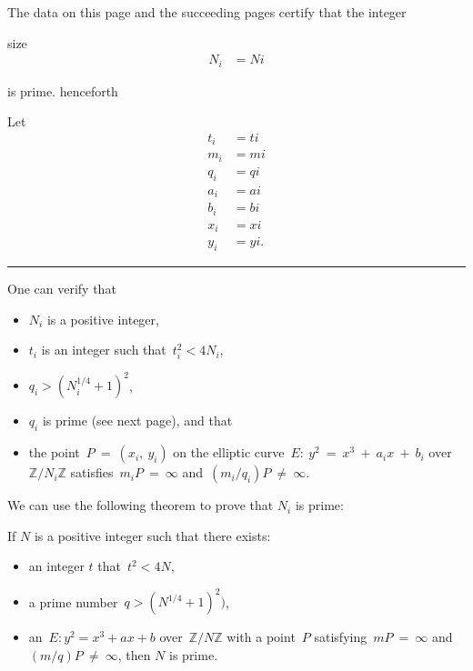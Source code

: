 \pagestyle{empty}
\phantom{a}
\vspace{2em}

\begin{center}
{\Huge {}}
\end{center}
\vspace{2em}

\noindent The data on this page and the succeeding pages certify that the integer

{ {{ size }}%
\begin{align*}
N_{ {{ i }} } &= {{ Ni }}
\end{align*}
}

\noindent is prime. {{ henceforth }}

\vspace{2em}

\noindent Let
{\tiny
\begin{align*}
t_{ {{ i }} } &= {{ ti }} \\
m_{ {{ i }} } &= {{ mi }} \\
q_{ {{ i }} } &= {{ qi }} \\
a_{ {{ i }} } &= {{ ai }} \\
b_{ {{ i }} } &= {{ bi }} \\
x_{ {{ i }} } &= {{ xi }} \\
y_{ {{ i }} } &= {{ yi }}.
\end{align*}
}

\vspace{0.5em}
\hrule
\vspace{0.5em}

\begin{multicols}{2}
\noindent One can verify that
\begin{itemize}
\item $N_{ {{ i }} }$ is a positive integer,
\item $t_{ {{ i }} }$ is an integer such that~$t_{ {{ i }} }^2 < 4N_{ {{ i }} }$,
\item $q_{ {{ i }} } > \left(N_{ {{ i }} }^{1/4} + 1\right)^2$,
\item $q_{ {{ i }} }$ is prime (see next page), and that
\item the point~$P~=~(x_{ {{ i }} },~y_{ {{ i }} })$ on the elliptic curve~$E:~y^2~=~x^3~+~a_{ {{ i }} }x~+~b_{ {{ i }} }$ over~$\mathbb{Z}/{N_{ {{ i }} }}\mathbb{Z}$ satisfies~$m_{ {{ i }} }P~=~\infty$ and~$(m_{ {{ i }} }/q_{ {{ i }} })P~\neq~\infty$.
\end{itemize}
\columnbreak
\noindent We can use the following theorem to prove that $N_{ {{ i }} }$ is prime:
\begin{theorem*}
If $N$ is a positive integer such that there exists:
\begin{itemize}
\item an integer $t$ that~$t^2 < 4N$,
\item a prime number~$q > (N^{1/4} + 1)^2)$,
\item an~$E: y^2 = x^3 + ax + b$ over~$\mathbb{Z}/{N}\mathbb{Z}$ with a point~$P$ satisfying~$mP~=~\infty$ and~$(m/q)P~\neq~\infty$,
then $N$ is prime.
\end{itemize}
\end{theorem*}
\end{multicols}

\newpage
